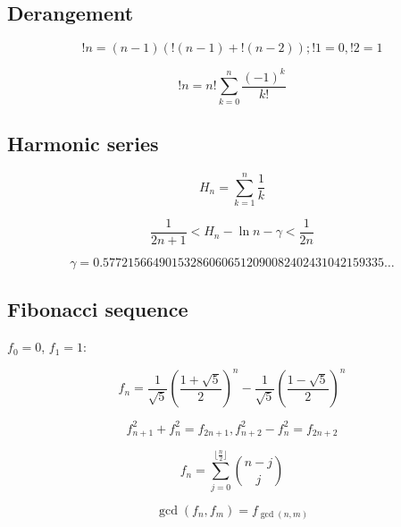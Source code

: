 	\subsection{Derangement}
	
	\begin{equation*}
	!n = (n - 1)( !(n - 1) + !(n - 2) ); !1 = 0, !2 = 1
	\end{equation*}
	
	\begin{equation*}
	!n = n! \sum_{k = 0}^n \frac{(-1)^k}{k!}
	\end{equation*}
	
	\subsection{Harmonic series}
	
	\begin{equation*}
	H_n = \sum_{k = 1}^n \frac{1}{k}
	\end{equation*}
	
	\begin{equation*}
	\frac{1}{2n+1} < H_n - \ln n - \gamma < \frac{1}{2n}
	\end{equation*}
	
	\begin{equation*}
	\gamma = 0.57721 56649 01532 86060 65120 90082 40243 10421 59335 \ldots
	\end{equation*}
	
	\subsection{Fibonacci sequence} $f_0 = 0$, $f_1 = 1$:
	
	\begin{equation*}
	f_n = \frac{1}{\sqrt{5}}(\frac{1 + \sqrt{5}}{2})^n - \frac{1}{\sqrt{5}}(\frac{1 - \sqrt{5}}{2})^n
	\end{equation*}
	
	\begin{equation*}
	f_{n+1}^2 + f_n^2 = f_{2n + 1}, 
	f_{n+2}^2 - f_n^2 = f_{2n + 2}
	\end{equation*}
	
	\begin{equation*}
	f_n = \sum_{j = 0}^{\lfloor \frac{n}{2} \rfloor} \binom{n-j}{j}
	\end{equation*}
	
	\begin{equation*}
	\gcd(f_n,f_m)=f_{\gcd(n,m)}
	\end{equation*}
